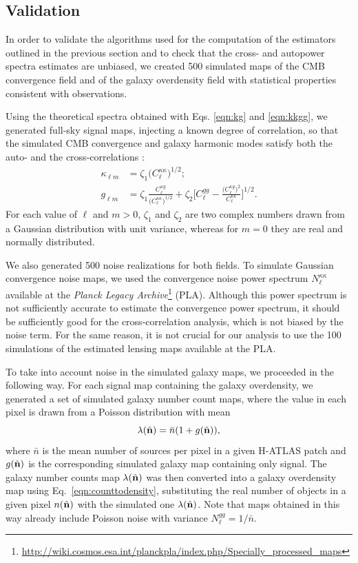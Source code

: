 \subsection{Validation}
In order to validate the algorithms used for the computation of the estimators outlined in the previous section and to check that the cross- and autopower spectra estimates are unbiased, we created 500 simulated maps of the \gls{CMB} convergence field and of the galaxy overdensity field with statistical properties consistent with observations.

Using the theoretical spectra obtained with Eqs. \eqref{eqn:kg} and \eqref{eqn:kkgg}, we generated full-sky signal maps, injecting a known degree of correlation, so that the simulated \gls{CMB} convergence and galaxy harmonic modes satisfy both the auto- and the cross-correlations \citep{Kamionkowski1997}:
%
\begin{equation}
\begin{split}
\kappa_{\ell m} &= \zeta_1 \bigl(C_{\ell}^{\kappa\kappa} \bigr)^{1/2};\\
g_{\ell m} &= \zeta_1 \frac{C_{\ell}^{\kappa g}}{\bigl(C_{\ell}^{\kappa\kappa} \bigr)^{1/2}} + \zeta_2 \Biggl[ C_{\ell}^{gg} - \frac{\bigl(C_{\ell}^{\kappa g}\bigr)^2}{C_{\ell}^{\kappa\kappa}} \Biggr]^{1/2}.
\end{split}
\end{equation}
%
For each value of $\ell$ and $m>0$, $\zeta_1$ and $\zeta_2$ are two complex numbers drawn from a Gaussian distribution with unit variance, whereas for $m=0$ they are real and normally distributed.

We also generated 500 noise realizations for both fields. To simulate Gaussian convergence noise maps, we used the convergence noise power spectrum $N^{\kappa\kappa}_{\ell}$ available at the \textit{Planck Legacy Archive}\footnote{\url{http://wiki.cosmos.esa.int/planckpla/index.php/Specially_processed_maps}} (PLA). Although this power spectrum is not sufficiently accurate to estimate the convergence power spectrum, it should be sufficiently good for the cross-correlation analysis, which is not biased by the noise term. For the same reason, it is not crucial for our analysis to use the 100 simulations of the estimated lensing maps available at the PLA.

To take into account noise in the simulated galaxy maps, we proceeded in the following way. For each signal map containing the galaxy overdensity, we generated a set of  simulated galaxy number count maps, where the value in each pixel is drawn from a Poisson distribution with mean
%
\begin{equation}
\lambda(\hat{\mathbf{n}}) = \bar{n}(1+g(\hat{\mathbf{n}})),
\end{equation}
%
where $\bar{n}$ is the mean number of sources per pixel in a given H-ATLAS patch and $g(\hat{\mathbf{n}})$ is the corresponding simulated galaxy map containing only signal. The galaxy number counts map $\lambda(\hat{\mathbf{n}})$ was then converted into a galaxy overdensity map using Eq.~\eqref{eqn:counttodensity}, substituting the real number of objects in a given pixel $n(\hat{\mathbf{n}})$ with the simulated one $\lambda(\hat{\mathbf{n}})$. Note that maps obtained in this way already include Poisson noise with variance $N^{gg}_{\ell} = 1/\bar{n}$.

